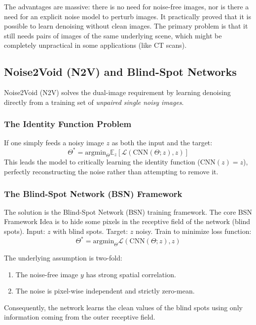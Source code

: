 The advantages are massive: there is no need for noise-free images, nor is there a need for an explicit noise model to perturb images. It practically proved that it is possible to learn denoising without clean images. The primary problem is that it still needs pairs of images of the same underlying scene, which might be completely unpractical in some applications (like CT scans).

\subsection{Noise2Void (N2V) and Blind-Spot Networks}
Noise2Void (N2V) solves the dual-image requirement by learning denoising directly from a training set of \textit{unpaired single noisy images}. 

\subsubsection{The Identity Function Problem}
If one simply feeds a noisy image $z$ as both the input and the target:
\begin{equation}
    \Theta^* = \text{argmin}_\Theta \mathbb{E}_z [\mathcal{L}(\text{CNN}(\Theta; z), z)]
\end{equation}
This leads the model to critically learning the identity function ($\text{CNN}(z) = z$), perfectly reconstructing the noise rather than attempting to remove it.

\subsubsection{The Blind-Spot Network (BSN) Framework}
The solution is the Blind-Spot Network (BSN) training framework. The core BSN Framework Idea is to hide some pixels in the receptive field of the network (blind spots). 
Input: $z$ with blind spots.
Target: $z$ noisy.
Train to minimize loss function:
\begin{equation}
    \Theta^* = \text{argmin}_\Theta \mathcal{L}(\text{CNN}(\Theta; z), z)
\end{equation}

The underlying assumption is two-fold:
\begin{enumerate}
    \item The noise-free image $y$ has strong spatial correlation.
    \item The noise is pixel-wise independent and strictly zero-mean.
\end{enumerate}
Consequently, the network learns the clean values of the blind spots using only information coming from the outer receptive field.

